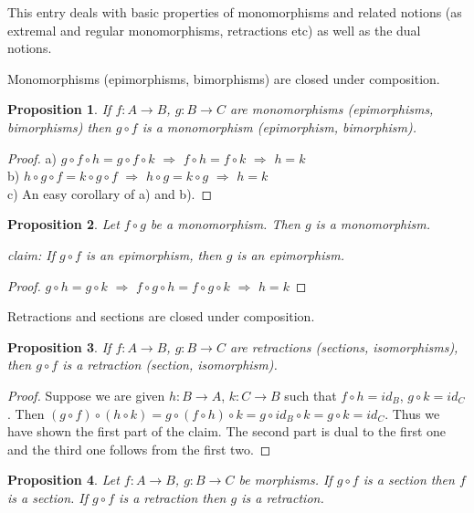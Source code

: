 \documentclass[12pt]{article}
\newcommand{\Map}[3]{#1:#2\to#3}
\newtheorem{PROP}{Proposition}
\begin{document}
This entry deals with basic properties of monomorphisms and related notions (as extremal and
regular monomorphisms, retractions etc) as well as the dual notions.

Monomorphisms (epimorphisms, bimorphisms) are closed under composition.

\begin{PROP}
If $\Map fAB$, $\Map gBC$ are monomorphisms (epimorphisms, bimorphisms) then $g\circ f$ is
a monomorphism (epimorphism, bimorphism).
\end{PROP}

\begin{proof}
a) $g\circ f\circ h=g\circ f\circ k$ $\Rightarrow$ $f\circ h=f\circ k$ $\Rightarrow$ $h=k$ \\
b) $h\circ g\circ f=k\circ g\circ f$ $\Rightarrow$ $h\circ g=k\circ g$ $\Rightarrow$ $h=k$ \\
c) An easy corollary of a) and b).
\end{proof}

\begin{PROP} %
Let $f\circ g$ be a monomorphism. Then $g$ is a monomorphism.

 claim: If $g\circ f$ is an epimorphism, then $g$ is an
epimorphism.
\end{PROP}

\begin{proof}
$g\circ h=g\circ k$ $\Rightarrow$ $f\circ g\circ h=f\circ g\circ k$ $\Rightarrow$ $h=k$
\end{proof}

Retractions and sections are closed under composition.

\begin{PROP} %
If $\Map fAB$, $\Map gBC$ are retractions (sections, isomorphisms), then $g\circ f$ is
a retraction (section, isomorphism).
\end{PROP}

\begin{proof}
Suppose we are given $\Map hBA$, $\Map kCB$ such that $f\circ h=id_B$, $g\circ k=id_C$. Then
$(g\circ f)\circ(h\circ k)=g\circ(f\circ h)\circ k=g\circ id_B\circ k=g\circ k=id_C$. Thus we
have shown the first part of the claim. The second part is dual to the first one and the
third one follows from the first two.
\end{proof}

\begin{PROP} %
Let $\Map fAB$, $\Map gBC$ be morphisms. If $g\circ f$ is a section then $f$ is a section. If
$g\circ f$ is a retraction then $g$ is a retraction.
\end{PROP}
\end{document}
